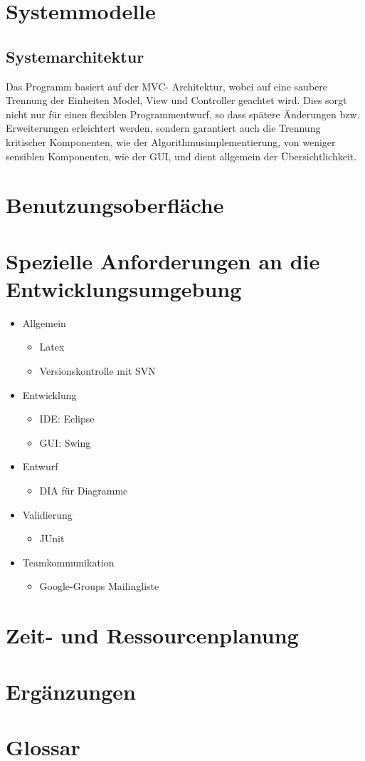 \documentclass[10pt,a4paper]{article}
\begin{document}
\section{Systemmodelle}
\subsection{Systemarchitektur}
Das Programm basiert auf der MVC- Architektur, wobei auf eine saubere Trennung der Einheiten Model, View und Controller geachtet wird. Dies sorgt nicht nur für einen flexiblen Programmentwurf, so dass spätere Änderungen bzw. Erweiterungen erleichtert werden, sondern garantiert auch die Trennung kritischer Komponenten, wie der Algorithmusimplementierung, von weniger sensiblen Komponenten, wie der GUI, und dient allgemein der Übersichtlichkeit.

\section{Benutzungsoberfläche}

\section{Spezielle Anforderungen an die Entwicklungsumgebung}
\begin{itemize}
	\item Allgemein
	\begin{itemize}
		\item Latex
		\item Versionskontrolle mit SVN
	\end{itemize}
	\item Entwicklung
	\begin{itemize}
		\item IDE: Eclipse
		\item GUI: Swing
	\end{itemize}
	\item Entwurf
	\begin{itemize}
		\item DIA für Diagramme
	\end{itemize}
	\item Validierung
	\begin{itemize}
		\item JUnit
	\end{itemize}
	\item Teamkommunikation
	\begin{itemize}
		\item Google-Groups Mailingliste
	\end{itemize}
\end{itemize}

\section{Zeit- und Ressourcenplanung}

\section{Ergänzungen}

\section{Glossar}
\end{document}
